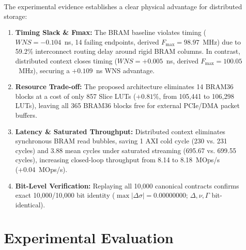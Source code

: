 \documentclass[sigconf,anonymous,review]{acmart}
\begin{document}
The experimental evidence establishes a clear physical advantage for distributed storage:
\begin{enumerate}
    \item \textbf{Timing Slack \& Fmax:} The BRAM baseline violates timing ($WNS = -0.104$~ns, 14 failing endpoints, derived $F_{\max} = 98.97$~MHz) due to 59.2\% interconnect routing delay around rigid BRAM columns. In contrast, distributed context closes timing ($WNS = +0.005$~ns, derived $F_{\max} = 100.05$~MHz), securing a $+0.109$~ns WNS advantage.
    \item \textbf{Resource Trade-off:} The proposed architecture eliminates 14 BRAM36 blocks at a cost of only 857 Slice LUTs ($+0.81\%$, from 105,441 to 106,298 LUTs), leaving all 365 BRAM36 blocks free for external PCIe/DMA packet buffers.
    \item \textbf{Latency \& Saturated Throughput:} Distributed context eliminates synchronous BRAM read bubbles, saving 1 AXI cold cycle (230 vs. 231 cycles) and 3.88 mean cycles under saturated streaming (695.67 vs. 699.55 cycles), increasing closed-loop throughput from 8.14 to 8.18~MOps/s (+0.04~MOps/s).
    \item \textbf{Bit-Level Verification:} Replaying all 10,000 canonical contracts confirms exact 10,000/10,000 bit identity ($\max |\Delta\sigma| = 0.00000000$; $\Delta, \nu, \Gamma$ bit-identical).
\end{enumerate}

\section{Experimental Evaluation}
\end{document}
